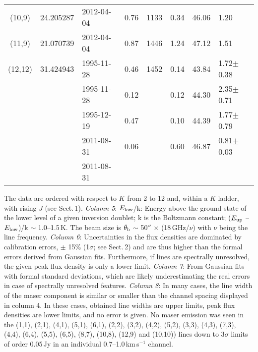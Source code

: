 \documentclass[oldversion]{aa}
\begin{document}
\begin{table*}
\begin{flushleft}
\begin{tabular}{cclcrccl}
  (10,9)  & 24.205287 & 2012-04-04 &  0.76          &  1133           & 0.34  & 46.06 & 1.20             \\
  (11,9)  & 21.070739 & 2012-04-04 &  0.87          &  1446           & 1.24  & 47.12 & 1.51             \\
 (12,12)  & 31.424943 & 1995-11-28 &  0.46          &  1452           & 0.14  & 43.84 & 1.72$\pm$0.38    \\
          &           & 1995-11-28    &  0.12          &                 & 0.12  & 44.30 & 2.35$\pm$0.71    \\
          &           & 1995-12-19 &  0.47          &                 & 0.10  & 44.39 & 1.77$\pm$0.79    \\
          &           & 2011-08-31 &  0.06          &                 & 0.60  & 46.87 & 0.81$\pm$0.03    \\
          &           & 2011-08-31    &                &                 &       &                &                  \\
\hline
\end{tabular}
\end{flushleft}
The data are ordered with respect to $K$ from 2 to 12 and, 
within a $K$ ladder, with rising $J$ (see Sect.\,1). 
{\it Column 5}: $E_{\rm low}$/k: Energy above the ground state of the 
lower level of a given inversion doublet; k is the Boltzmann 
constant; ($E_{\rm up}$ -- $E_{\rm low}$)/k $\sim$ 1.0--1.5\,K. 
The beam size is $\theta_{\rm b}$ $\sim$ 50$''$ $\times$ 
(18\,GHz/$\nu$) with $\nu$ being the line frequency.
{\it Column 6}: Uncertainties in the flux densities are dominated by 
calibration errors, $\pm$ 15\% (1$\sigma$; see Sect.\,2) 
and are thus higher than the formal errors derived from Gaussian 
fits. Furthermore, if lines are spectrally unresolved, the 
given peak flux density is only a lower limit. 
{\it Column 7}: From Gaussian fits with formal standard deviations,
which are likely underestimating the real errors in case of 
spectrally unresolved features. {\it Column 8}: In many cases, the 
line width of the maser component is similar or smaller than the channel 
spacing displayed in column 4. In these cases, obtained line widths 
are upper limits, peak flux densities are lower limits, and no 
error is given. No maser emission was seen in the (1,1), (2,1),
(4,1), (5,1), (6,1), (2,2), (3,2), (4,2), (5,2), (3,3), (4,3), 
(7,3), (4,4), (6,4), (5,5), (6,5), (8,7), (10,8), (12,9) and (10,10))
lines down to 3$\sigma$ limits of order 0.05\,Jy in an individual 
0.7--1.0\,km\,s$^{-1}$ channel.
\end{table*}
\end{document}

